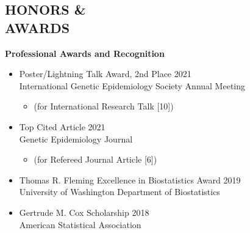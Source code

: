 \documentclass[margin]{res}
\begin{document}
\begin{resume}
\section{HONORS \& \\ AWARDS}

\textbf{Professional Awards and Recognition}
\begin{itemize}
\item Poster/Lightning Talk Award, 2nd Place   \hfill 2021 \\
International Genetic Epidemiology Society Annual Meeting
	\begin{itemize}[leftmargin=-0in] \vspace{-0.2cm}
	\item[] 
	\begin{footnotesize}(for International Research Talk [10])\end{footnotesize}
	\end{itemize} \vspace{-0.1cm}
\item Top Cited Article  \hfill 2021 \\
Genetic Epidemiology Journal
	\begin{itemize}[leftmargin=-0in] \vspace{-0.2cm}
	\item[] 
	\begin{footnotesize}(for Refereed Journal Article [6])\end{footnotesize}
	\end{itemize} \vspace{-0.1cm}
\item Thomas R. Fleming Excellence in Biostatistics Award \hfill 2019 \\   
University of Washington Department of Biostatistics
\item Gertrude M. Cox Scholarship \hfill 2018 \\ American Statistical Association

\end{itemize}
\end{resume}
\end{document}
